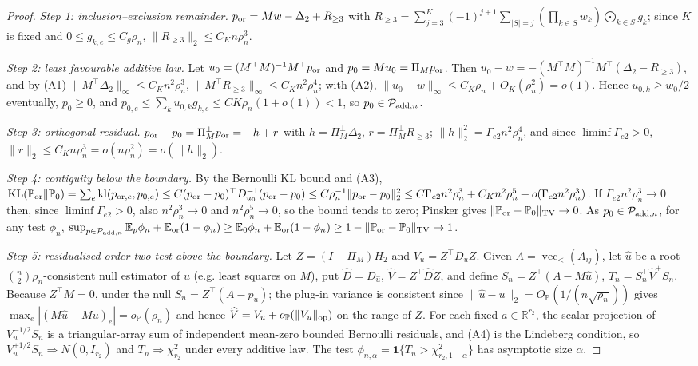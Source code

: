 \documentclass[12pt]{article}
\newcommand{\1}{\mathbf{1}}
\begin{document}
\begin{proof}
\emph{Step 1: inclusion--exclusion remainder.}
$p_{\rm or}=Mw-\Delta_2+R_{\ge3}$ with $R_{\ge3}=\sum_{j=3}^K(-1)^{j+1}\sum_{|S|=j}(\prod_{k\in
S}w_k)\bigodot_{k\in S}g_k$; since $K$ is fixed and $0\le g_{k,e}\le C_g\rho_n$, $\|R_{\ge3}\|_2\le
C_Kn\rho_n^3$.

\emph{Step 2: least favourable additive law.} Let $u_0=(M^\top M)^{-1}M^\top p_{\rm or}$ and
$p_0=Mu_0=\Pi_Mp_{\rm or}$. Then $u_0-w=-(M^\top M)^{-1}M^\top(\Delta_2-R_{\ge3})$, and by (A1)
$\|M^\top\Delta_2\|_\infty\le C_Kn^2\rho_n^3$, $\|M^\top R_{\ge3}\|_\infty\le C_Kn^2\rho_n^4$; with
(A2), $\|u_0-w\|_\infty\le C_K\rho_n+O_K(\rho_n^2)=o(1)$. Hence $u_{0,k}\ge w_0/2$ eventually,
$p_0\ge0$, and $p_{0,e}\le\sum_ku_{0,k}g_{k,e}\le CK\rho_n(1+o(1))<1$, so $p_0\in\mathcal P_{{\rm
add},n}$.

\emph{Step 3: orthogonal residual.} $p_{\rm or}-p_0=\Pi_M^\perp p_{\rm or}=-h+r$ with
$h=\Pi_M^\perp\Delta_2$, $r=\Pi_M^\perp R_{\ge3}$; $\|h\|_2^2=\Gamma_{e2}n^2\rho_n^4$, and since
$\liminf\Gamma_{e2}>0$, $\|r\|_2\le C_Kn\rho_n^3=o(n\rho_n^2)=o(\|h\|_2)$.

\emph{Step 4: contiguity below the boundary.} By the Bernoulli KL bound and (A3),
$\operatorname{KL}(\mathbb P_{\rm or}\|\mathbb P_0)=\sum_e\operatorname{kl}(p_{{\rm or},e},p_{0,e})\le
C(p_{\rm or}-p_0)^\top D_{u_0}^{-1}(p_{\rm or}-p_0)\le C\rho_n^{-1}\|p_{\rm or}-p_0\|_2^2\le
C\Gamma_{e2}n^2\rho_n^3+C_Kn^2\rho_n^5+o(\Gamma_{e2}n^2\rho_n^3)$. If $\Gamma_{e2}n^2\rho_n^3\to0$
then, since $\liminf\Gamma_{e2}>0$, also $n^2\rho_n^3\to0$ and $n^2\rho_n^5\to0$, so the bound tends to
zero; Pinsker gives $\|\mathbb P_{\rm or}-\mathbb P_0\|_{\rm TV}\to0$. As $p_0\in\mathcal P_{{\rm
add},n}$, for any test $\phi_n$, $\sup_{p\in\mathcal P_{{\rm add},n}}\mathbb E_p\phi_n+\mathbb
E_{\rm or}(1-\phi_n)\ge\mathbb E_0\phi_n+\mathbb E_{\rm or}(1-\phi_n)\ge1-\|\mathbb P_{\rm or}-\mathbb
P_0\|_{\rm TV}\to1$.

\emph{Step 5: residualised order-two test above the boundary.} Let $Z=(I-\Pi_M)H_2$ and
$V_u=Z^\top D_uZ$. Given $A=\operatorname{vec}_<(A_{ij})$, let $\widehat u$ be a
root-$\binom{n}{2}\rho_n$-consistent null estimator of $u$ (e.g. least squares on $M$), put
$\widehat D=D_{\widehat u}$, $\widehat V=Z^\top\widehat DZ$, and define $S_n=Z^\top(A-M\widehat u)$,
$T_n=S_n^\top\widehat V^+S_n$. Because $Z^\top M=0$, under the null $S_n=Z^\top(A-p_u)$; the plug-in
variance is consistent since $\|\widehat u-u\|_2=O_{\mathbb P}(1/(n\sqrt{\rho_n}))$ gives
$\max_e|(M\widehat u-Mu)_e|=o_{\mathbb P}(\rho_n)$ and hence $\widehat V=V_u+o_{\mathbb P}
(\|V_u\|_{\rm op})$ on the range of $Z$. For each fixed $a\in\mathbb R^{r_2}$, the scalar projection of
$V_u^{-1/2}S_n$ is a triangular-array sum of independent mean-zero bounded Bernoulli residuals, and
(A4) is the Lindeberg condition, so $V_u^{+1/2}S_n\Rightarrow N(0,I_{r_2})$ and $T_n\Rightarrow
\chi^2_{r_2}$ under every additive law. The test $\phi_{n,\alpha}=\mathbf 1\{T_n>\chi^2_{r_2,1-\alpha}\}$
has asymptotic size $\alpha$.


\end{proof}
\end{document}
